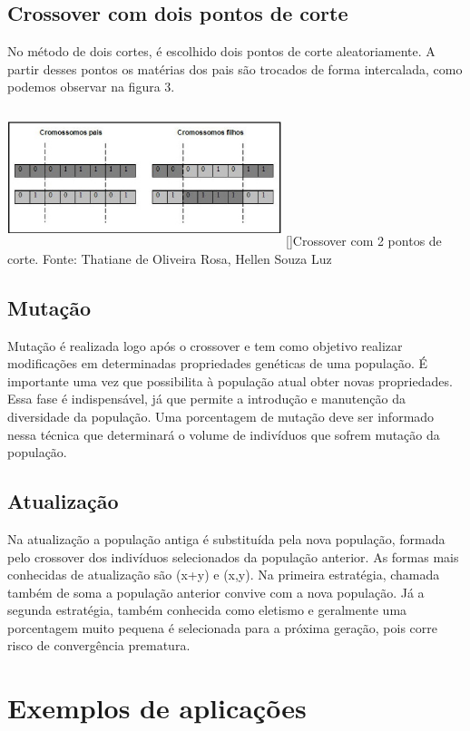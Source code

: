 \documentclass[a4paper,11pt]{article}
\newenvironment{Figure}
  {\par\medskip\noindent\minipage{\linewidth}}
    {\endminipage\par\medskip}
\begin{document}
\begin{multicols}{2}
\subsection{Crossover com dois pontos de corte}
No método de dois cortes, é escolhido dois pontos de corte aleatoriamente. A partir desses pontos os matérias dos pais são trocados de forma intercalada, como podemos observar na figura 3.
\begin{Figure}
	\centering 
	\includegraphics[width=8cm, height=4cm]{figura3}
	[]{Crossover com 2 pontos de corte. Fonte: Thatiane de Oliveira Rosa, Hellen Souza Luz}
	\label{medium}
\end{Figure}

\subsection{Mutação}
Mutação é realizada logo após o crossover e tem como objetivo realizar modificações em determinadas propriedades genéticas de uma população. É importante uma vez que possibilita à população atual obter novas propriedades. Essa fase é indispensável, já que permite a introdução e manutenção da diversidade da população. Uma porcentagem de mutação deve ser informado nessa técnica que determinará o volume de indivíduos que sofrem mutação da população.

\subsection{Atualização}
Na atualização a população antiga é substituída pela nova população, formada pelo crossover dos indivíduos selecionados da população anterior. As formas mais conhecidas de atualização são (x+y) e (x,y). Na primeira estratégia, chamada também de soma a população anterior convive com a nova população. Já a segunda estratégia, também conhecida como eletismo e geralmente uma porcentagem muito pequena é selecionada para a próxima geração, pois corre risco de convergência prematura.

\section{Exemplos de aplicações}

\end{multicols}
\end{document}
